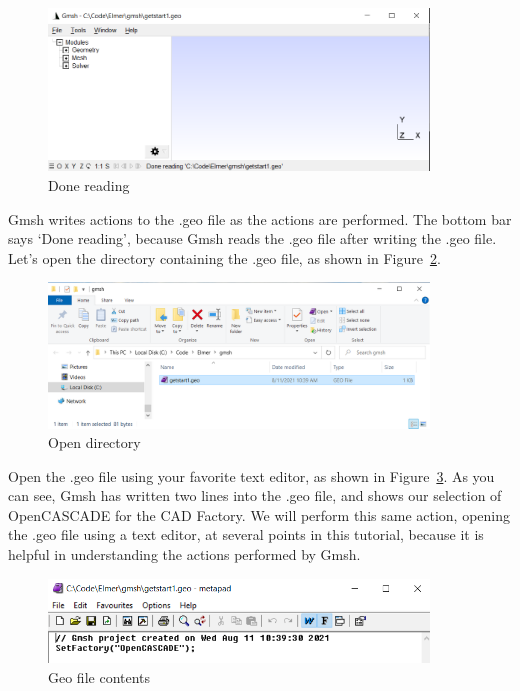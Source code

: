 \begin{figure}[H]
\centering
\includegraphics[width=0.9\textwidth]{gmsh-05}
\caption{Done reading}\label{fg:gmsh-05}
\end{figure}

Gmsh writes actions to the .geo file as the actions are performed.  The bottom bar says `Done reading', because Gmsh reads the .geo file after writing the .geo file.  Let's open the directory containing the .geo file, as shown in Figure~\ref{fg:gmsh-06}.

\begin{figure}[H]
\centering
\includegraphics[width=0.9\textwidth]{gmsh-06}
\caption{Open directory}\label{fg:gmsh-06}
\end{figure}

Open the .geo file using your favorite text editor, as shown in Figure~\ref{fg:gmsh-07}.  As you can see, Gmsh has written two lines into the .geo file, and shows our selection of OpenCASCADE for the CAD Factory.  We will perform this same action, opening the .geo file using a text editor, at several points in this tutorial, because it is helpful in understanding the actions performed by Gmsh.

\begin{figure}[H]
\centering
\includegraphics[width=0.9\textwidth]{gmsh-07}
\caption{Geo file contents}\label{fg:gmsh-07}
\end{figure}

